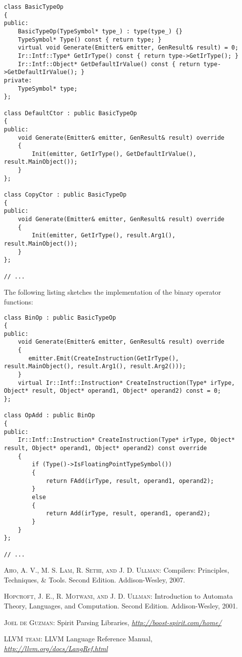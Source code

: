 \documentclass[a4paper,oneside,11pt]{book}
\theoremstyle{definition}
\begin{document}
\begin{flushleft}
\lstset{language=C++}
\begin{lstlisting}[frame=trBL]
class BasicTypeOp
{
public:
    BasicTypeOp(TypeSymbol* type_) : type(type_) {}
    TypeSymbol* Type() const { return type; }
    virtual void Generate(Emitter& emitter, GenResult& result) = 0;
    Ir::Intf::Type* GetIrType() const { return type->GetIrType(); }
    Ir::Intf::Object* GetDefaultIrValue() const { return type->GetDefaultIrValue(); }
private:
    TypeSymbol* type;
};

class DefaultCtor : public BasicTypeOp
{
public:
    void Generate(Emitter& emitter, GenResult& result) override
    {
        Init(emitter, GetIrType(), GetDefaultIrValue(), result.MainObject());
    }
};

class CopyCtor : public BasicTypeOp
{
public:
    void Generate(Emitter& emitter, GenResult& result) override
    {
        Init(emitter, GetIrType(), result.Arg1(), result.MainObject());
    }
};

// ...
\end{lstlisting}

\clearpage
The following listing sketches the implementation of the binary operator functions:
\lstset{language=C++}
\begin{lstlisting}[frame=trBL]
class BinOp : public BasicTypeOp
{
public:
    void Generate(Emitter& emitter, GenResult& result) override
    {
       emitter.Emit(CreateInstruction(GetIrType(), result.MainObject(), result.Arg1(), result.Arg2()));
    }
    virtual Ir::Intf::Instruction* CreateInstruction(Type* irType, Object* result, Object* operand1, Object* operand2) const = 0;
};

class OpAdd : public BinOp
{
public:
    Ir::Intf::Instruction* CreateInstruction(Type* irType, Object* result, Object* operand1, Object* operand2) const override
    {
        if (Type()->IsFloatingPointTypeSymbol())
        {
            return FAdd(irType, result, operand1, operand2);
        }
        else
        {
            return Add(irType, result, operand1, operand2);
        }
    }
};

// ...
\end{lstlisting}
\end{flushleft}

\clearpage
\begin{thebibliography}{4}

 \textsc{Aho, A. V., M. S. Lam, R. Sethi, and J. D. Ullman}:
Compilers: Principles, Techniques, \& Tools. Second Edition. Addison-Wesley, 2007.

 \textsc{Hopcroft, J. E., R. Motwani, and J. D. Ullman}:
Introduction to Automata Theory, Languages, and Computation. Second Edition. Addison-Wesley, 2001.

 \textsc{Joel de Guzman}:
Spirit Parsing Libraries,
\textit{\url{http://boost-spirit.com/home/}}

 \textsc{LLVM team}:
LLVM Language Reference Manual,
\textit{\url{http://llvm.org/docs/LangRef.html}}

\end{thebibliography}
\end{document}
